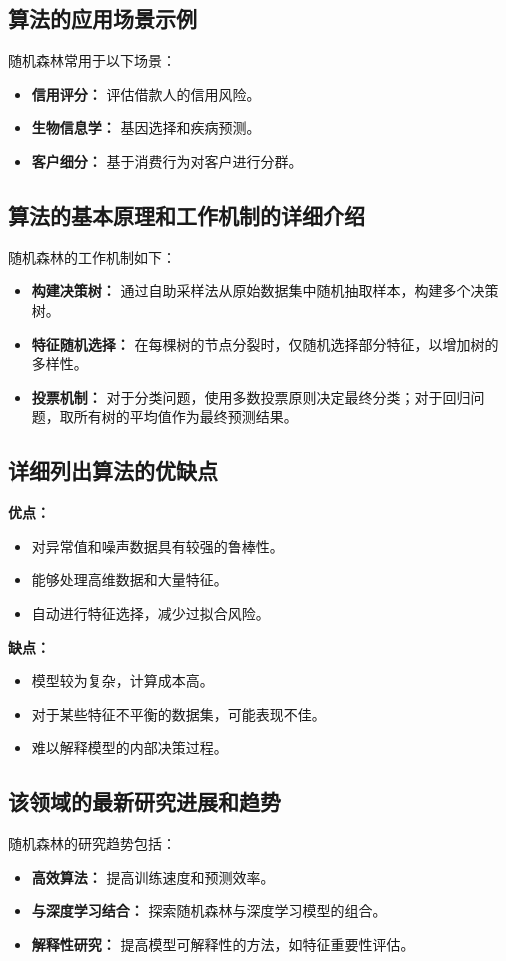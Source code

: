 \subsection*{算法的应用场景示例}
随机森林常用于以下场景：
\begin{itemize}
    \item \textbf{信用评分：} 评估借款人的信用风险。
    \item \textbf{生物信息学：} 基因选择和疾病预测。
    \item \textbf{客户细分：} 基于消费行为对客户进行分群。
\end{itemize}

\subsection*{算法的基本原理和工作机制的详细介绍}
随机森林的工作机制如下：
\begin{itemize}
    \item \textbf{构建决策树：} 通过自助采样法从原始数据集中随机抽取样本，构建多个决策树。
    \item \textbf{特征随机选择：} 在每棵树的节点分裂时，仅随机选择部分特征，以增加树的多样性。
    \item \textbf{投票机制：} 对于分类问题，使用多数投票原则决定最终分类；对于回归问题，取所有树的平均值作为最终预测结果。
\end{itemize}

\subsection*{详细列出算法的优缺点}
\textbf{优点：}
\begin{itemize}
    \item 对异常值和噪声数据具有较强的鲁棒性。
    \item 能够处理高维数据和大量特征。
    \item 自动进行特征选择，减少过拟合风险。
\end{itemize}

\textbf{缺点：}
\begin{itemize}
    \item 模型较为复杂，计算成本高。
    \item 对于某些特征不平衡的数据集，可能表现不佳。
    \item 难以解释模型的内部决策过程。
\end{itemize}

\subsection*{该领域的最新研究进展和趋势}
随机森林的研究趋势包括：
\begin{itemize}
    \item \textbf{高效算法：} 提高训练速度和预测效率。
    \item \textbf{与深度学习结合：} 探索随机森林与深度学习模型的组合。
    \item \textbf{解释性研究：} 提高模型可解释性的方法，如特征重要性评估。
\end{itemize}
